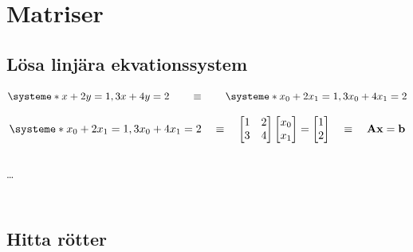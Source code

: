 \mode*

\section{Matriser}

\subsection{Lösa linjära ekvationssystem}

\begin{frame}
  \begin{equation*}
    \systeme*{
      x + 2y = 1,
      3x + 4y = 2
    }
    \qquad\equiv\qquad
    \systeme*{
      x_0 + 2x_1 = 1,
      3x_0 + 4x_1 = 2
    }
  \end{equation*}
\end{frame}

\begin{frame}
  \begin{equation*}
    \systeme*{
      x_0 + 2x_1 = 1,
      3x_0 + 4x_1 = 2
    }
    \quad\equiv\quad
    \begin{bmatrix}
      1 & 2 \\
      3 & 4
    \end{bmatrix}
    \begin{bmatrix}
      x_0 \\
      x_1
    \end{bmatrix}
    =
    \begin{bmatrix}
      1 \\
      2
    \end{bmatrix}
    \quad\equiv\quad
    \vect{A}\vect{x} = \vect{b}
  \end{equation*}
\end{frame}

\begin{frame}[fragile]
  \inputminted[linenos,lastline=4]{python}{examples/solve.py}
  \dots
  \inputminted[linenos,firstline=15,lastline=22]{python}{examples/solve.py}
\end{frame}

\begin{frame}[fragile]
  \inputminted[linenos,firstline=6,lastline=14]{python}{examples/solve.py}
\end{frame}


\subsection{Hitta rötter}

